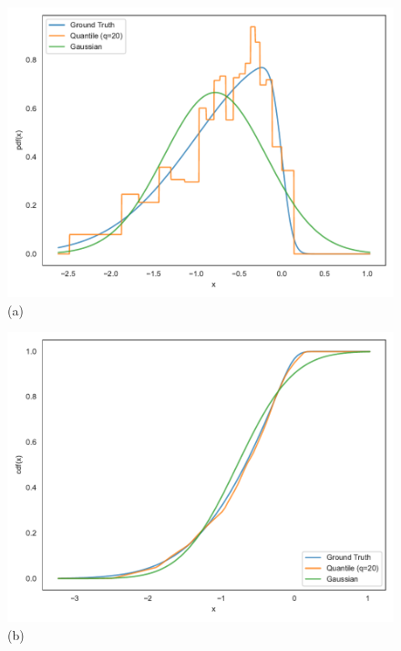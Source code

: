 \begin{landscape}
\begin{figure}[H]
  \label{fig:distest20}
  \centering
  \begin{minipage}[b]{0.4\textwidth}
    \centering
    \includegraphics[width=\linewidth]{figs/20_pdf_plot.pdf}
    {\small (a)}
  \end{minipage}
  \hfill
  \begin{minipage}[b]{0.4\textwidth}
    \centering
    \includegraphics[width=\linewidth]{figs/20_cdf_plot.pdf}
    \\[0.5em]
    {\small (b)}
  \end{minipage}

\end{figure}
\end{landscape}
